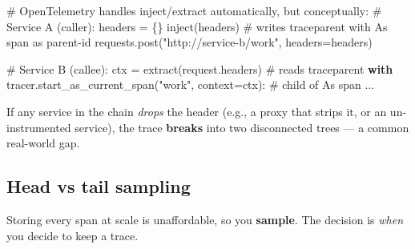 \documentclass[11pt]{article}
\newenvironment{Shaded}{\begin{snugshade}}{\end{snugshade}}
\newcommand{\CommentTok}[1]{\textcolor[rgb]{0.48,0.49,0.49}{#1}}
\newcommand{\ControlFlowTok}[1]{\textcolor[rgb]{0.99,0.74,0.29}{\textbf{#1}}}
\newcommand{\NormalTok}[1]{\textcolor[rgb]{0.81,0.81,0.76}{#1}}
\newcommand{\OperatorTok}[1]{\textcolor[rgb]{0.81,0.81,0.76}{#1}}
\newcommand{\StringTok}[1]{\textcolor[rgb]{0.96,0.31,0.31}{#1}}
\begin{document}
\begin{Shaded}
\begin{Highlighting}[]
\CommentTok{\# OpenTelemetry handles inject/extract automatically, but conceptually:}
\CommentTok{\# Service A (caller):}
\NormalTok{headers }\OperatorTok{=}\NormalTok{ \{\}}
\NormalTok{inject(headers)  }\CommentTok{\# writes traceparent with A\textquotesingle{}s span as parent{-}id}
\NormalTok{requests.post(}\StringTok{"http://service{-}b/work"}\NormalTok{, headers}\OperatorTok{=}\NormalTok{headers)}

\CommentTok{\# Service B (callee):}
\NormalTok{ctx }\OperatorTok{=}\NormalTok{ extract(request.headers)  }\CommentTok{\# reads traceparent}
\ControlFlowTok{with}\NormalTok{ tracer.start\_as\_current\_span(}\StringTok{"work"}\NormalTok{, context}\OperatorTok{=}\NormalTok{ctx):  }\CommentTok{\# child of A\textquotesingle{}s span}
\NormalTok{    ...}
\end{Highlighting}
\end{Shaded}

If any service in the chain \emph{drops} the header (e.g., a proxy that strips it, or an un-instrumented service), the trace \textbf{breaks} into two disconnected trees --- a common real-world gap.

\subsection{Head vs tail sampling}\label{head-vs-tail-sampling}

Storing every span at scale is unaffordable, so you \textbf{sample}. The decision is \emph{when} you decide to keep a trace.
\end{document}
